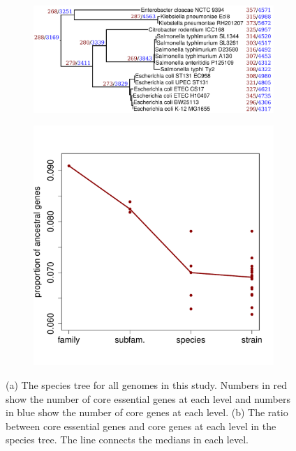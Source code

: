 \documentclass[12pt,letterpaper]{article}
\begin{document}
\begin{figure}
\captionsetup[subfigure]{justification=centering}
\begin{subfigure}{.6\textwidth}
  \centering
  \includegraphics[scale=0.12]{phylosift-aa-raxmlbootstrap-annotated.pdf}
  \caption{}
  \label{fig:tree}
\end{subfigure}
\begin{subfigure}{.4\textwidth}
  \centering
  \includegraphics[scale=0.4]{fitch.pdf}
  \caption{}
  \label{fig:fitch}
\end{subfigure}

\caption{(a) The species tree for all genomes in this study. Numbers in red show the number of core essential genes at each level and numbers in blue show the number of core genes at each level. (b) The ratio between core essential genes and core genes at each level in the species tree. The line connects the medians in each level.}
\label{fig:essentiality-phylogeny}
\end{figure}
\end{document}
